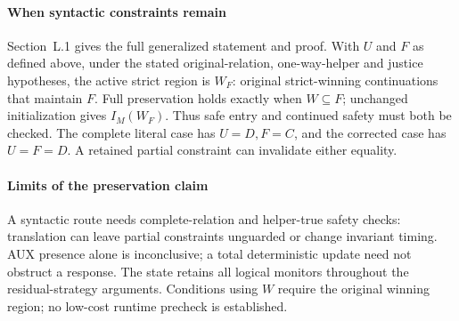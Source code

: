 \paragraph{When syntactic constraints remain}
Section~L.1 gives the full generalized statement and proof.
With $U$ and $F$ as defined above, under the stated original-relation,
one-way-helper and justice
hypotheses, the active strict region is $W_F$: original strict-winning
continuations that maintain $F$. Full preservation holds exactly when
$W\subseteq F$; unchanged initialization gives $I_M(W_F)$.
Thus safe entry and continued safety must both be checked.
The complete literal case has $U=D,F=C$, and the corrected case has
$U=F=D$. A retained partial constraint can invalidate either equality.

\paragraph{Limits of the preservation claim}
A syntactic route needs complete-relation and helper-true safety checks:
translation can leave partial constraints unguarded or change invariant
timing. AUX presence alone is inconclusive; a total deterministic update
need not obstruct a response. The state retains all logical monitors
throughout the residual-strategy arguments. Conditions using $W$ require
the original winning region; no low-cost runtime precheck is established.
